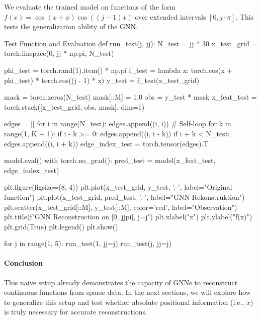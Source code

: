 We evaluate the trained model on functions of the form $f(x) = \cos(x + \phi)\cos((j-1)x)$ over extended intervals $[0, j \cdot \pi]$. This tests the generalization ability of the GNN.

\begin{codeonly}{Test Function and Evaluation}
def run_test(j, jj):
    N_test = jj * 30
    x_test_grid = torch.linspace(0, jj * np.pi, N_test)

    phi_test = torch.rand(1).item() * np.pi
    f_test = lambda x: torch.cos(x + phi_test) * torch.cos((j - 1) * x)
    y_test = f_test(x_test_grid)

    mask = torch.zeros(N_test)
    mask[::M] = 1.0
    obs = y_test * mask
    x_feat_test = torch.stack([x_test_grid, obs, mask], dim=1)

    edges = []
    for i in range(N_test):
        edges.append((i, i))  # Self-loop
        for k in range(1, K + 1):
            if i - k >= 0:
                edges.append((i, i - k))
            if i + k < N_test:
                edges.append((i, i + k))
    edge_index_test = torch.tensor(edges).T

    model.eval()
    with torch.no_grad():
        pred_test = model(x_feat_test, edge_index_test)

    plt.figure(figsize=(8, 4))
    plt.plot(x_test_grid, y_test, '.-', label="Original function")
    plt.plot(x_test_grid, pred_test, '.-', label="GNN Rekonstruktion")
    plt.scatter(x_test_grid[::M], y_test[::M], color='red', label="Observation")
    plt.title(f"GNN Reconstruction on [0, {jj}pi], j={j}")
    plt.xlabel("x")
    plt.ylabel("f(x)")
    plt.grid(True)
    plt.legend()
    plt.show()

for j in range(1, 5):
    run_test(1, jj=j)
    run_test(j, jj=j)
\end{codeonly}

\paragraph{Conclusion}

This naive setup already demonstrates the capacity of GNNs to reconstruct continuous functions from sparse data. In the next sections, we will explore how to generalize this setup and test whether absolute positional information (i.e., $x$) is truly necessary for accurate reconstructions.

%
